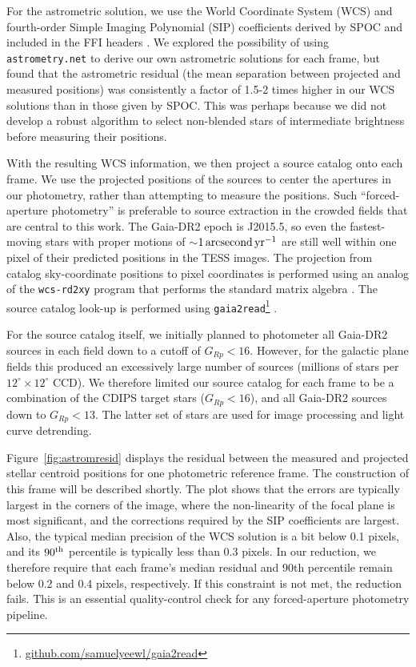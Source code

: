 \documentclass[12pt,twocolumn,tighten]{aastex62}
\begin{document}
For the astrometric solution, we use the World Coordinate System (WCS)
and fourth-order Simple Imaging Polynomial (SIP) coefficients derived
by SPOC and included in the FFI headers
\citep[][Sec.~8]{pence_fits_2010}.  We explored the possibility of
using \texttt{astrometry.net} \citep{lang_2010} to derive our own
astrometric solutions for each frame, but found that the astrometric
residual (the mean separation between projected and measured
positions) was consistently a factor of 1.5-2 times higher in our WCS
solutions than in those given by SPOC.  This was perhaps because we
did not develop a robust algorithm to select non-blended stars of
intermediate brightness before measuring their positions.

With the resulting WCS information, we then project a source catalog
onto each frame.  We use the projected positions of the sources to
center the apertures in our photometry, rather than attempting to
measure the positions.  Such ``forced-aperture photometry'' is
preferable to source extraction in the crowded fields that are central
to this work.  The Gaia-DR2 epoch is J2015.5, so even the
fastest-moving stars with proper motions of $\sim$$1\,{\rm
arcsecond}\,{\rm yr}^{-1}$ are still well within one pixel of their
predicted positions in the TESS images.  The projection from catalog
sky-coordinate positions to pixel coordinates is performed using an
analog of the \texttt{wcs-rd2xy} program that performs the standard
matrix algebra \citep{lang_2010}.  The source catalog look-up is
performed using
\texttt{gaia2read}\footnote{\url{github.com/samuelyeewl/gaia2read}}
\citep{kim_2018_gaia2read}.

For the source catalog itself, we initially planned to photometer all
Gaia-DR2 sources in each field down to a cutoff of $G_{Rp} < 16$.
However, for the galactic plane fields this produced an excessively
large number of sources (millions of stars per
$12^\circ\times12^\circ$ CCD).  We therefore limited our source
catalog for each frame to be a combination of the CDIPS target stars
($G_{Rp} < 16$), and all Gaia-DR2 sources down to $G_{Rp} < 13$.  The
latter set of stars are used for image processing and light curve
detrending.

Figure~\ref{fig:astromresid} displays the residual between the
measured and projected stellar centroid positions for one photometric
reference frame.  The construction of this frame will be described
shortly.  The plot shows that the errors are typically largest in the
corners of the image, where the non-linearity of the focal plane is
most significant, and the corrections required by the SIP coefficients
are largest.  Also, the typical median precision of the WCS solution
is a bit below 0.1 pixels, and its $90^{\rm th}$ percentile is
typically less than 0.3 pixels.  In our reduction, we therefore
require that each frame's median residual and 90th percentile remain
below 0.2 and 0.4 pixels, respectively. If this constraint is not met,
the reduction fails.  This is an essential quality-control check for
any forced-aperture photometry pipeline.
\end{document}
